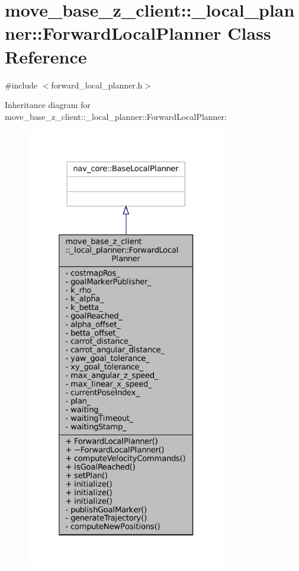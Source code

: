\hypertarget{classmove__base__z__client_1_1__local__planner_1_1ForwardLocalPlanner}{}\section{move\+\_\+base\+\_\+z\+\_\+client\+:\+:\+\_\+local\+\_\+planner\+:\+:Forward\+Local\+Planner Class Reference}
\label{classmove__base__z__client_1_1__local__planner_1_1ForwardLocalPlanner}


{\ttfamily \#include $<$forward\+\_\+local\+\_\+planner.\+h$>$}



Inheritance diagram for move\+\_\+base\+\_\+z\+\_\+client\+:\+:\+\_\+local\+\_\+planner\+:\+:Forward\+Local\+Planner\+:
\nopagebreak
\begin{figure}[H]
\begin{center}
\leavevmode
\includegraphics[height=550pt]{classmove__base__z__client_1_1__local__planner_1_1ForwardLocalPlanner__inherit__graph}
\end{center}
\end{figure}


